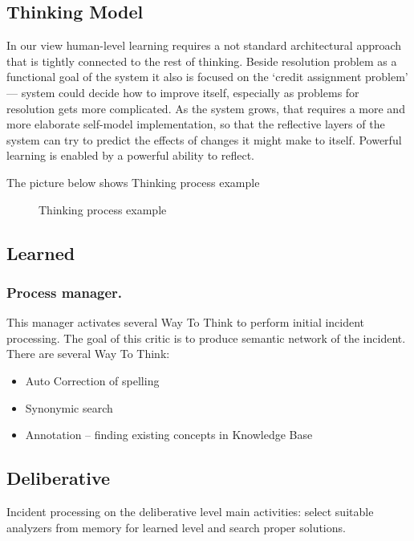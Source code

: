 \documentclass[runningheads,a4paper]{llncs}
\begin{document}
\begin{enumerate}
\section{Thinking Model}
In our view human-level learning requires a not standard architectural approach that is tightly connected to the rest of thinking. Beside resolution problem as a functional goal of the system it also is focused on the ‘credit assignment problem’ — system could decide how to improve itself, especially as problems for resolution gets more complicated.  As the system grows, that requires a more and more elaborate self-model implementation, so that the reflective layers of the system can try to predict the effects of changes it might make to itself. Powerful learning is enabled by a powerful ability to reflect.

The picture below shows Thinking process example

\begin{figure}


\caption{Thinking process example}
\end{figure}

\subsection{Learned}

\subsubsection{Process manager.} This manager activates several Way To Think to perform initial incident processing. The goal of this critic is to produce semantic network of the incident. There are several Way To Think:
\begin{itemize}
 \item Auto Correction of spelling
 \item Synonymic search
 \item Annotation – finding existing concepts in Knowledge Base
\end{itemize}

\subsection{Deliberative}

Incident processing on the deliberative level main activities: select suitable analyzers from memory for learned level and search proper solutions.


\end{enumerate}
\end{document}

